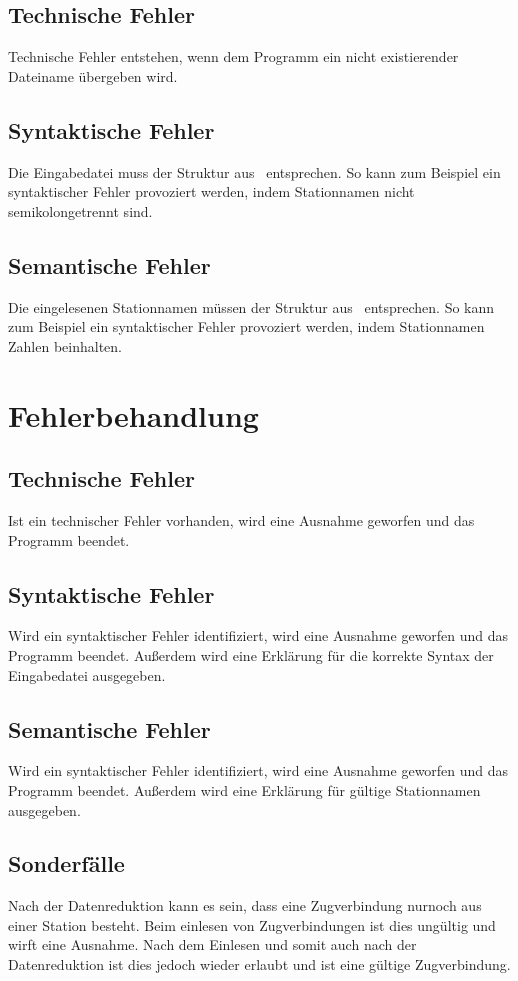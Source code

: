 \subsection{Technische Fehler}\label{subsec:technische-fehler}
Technische Fehler entstehen, wenn dem Programm ein nicht existierender Dateiname übergeben wird.

\subsection{Syntaktische Fehler}\label{subsec:syntaktische-fehler}
Die Eingabedatei muss der Struktur aus~ entsprechen.
So kann zum Beispiel ein syntaktischer Fehler provoziert werden, indem Stationnamen nicht semikolongetrennt sind.

\subsection{Semantische Fehler}\label{subsec:semantische-fehler}
Die eingelesenen Stationnamen müssen der Struktur aus~ entsprechen.
So kann zum Beispiel ein syntaktischer Fehler provoziert werden, indem Stationnamen Zahlen beinhalten.

\section{Fehlerbehandlung}\label{sec:fehlerbehandlung}

\subsection{Technische Fehler}\label{subsec:technische-fehler-behandlung}
Ist ein technischer Fehler vorhanden, wird eine Ausnahme geworfen und das Programm beendet.


\subsection{Syntaktische Fehler}\label{subsec:syntaktische-fehler-behandlung}
Wird ein syntaktischer Fehler identifiziert, wird eine Ausnahme geworfen und das Programm beendet. Außerdem wird eine Erklärung für die korrekte Syntax der Eingabedatei ausgegeben.

\subsection{Semantische Fehler}\label{subsec:semantische-fehler-behandlung}
Wird ein syntaktischer Fehler identifiziert, wird eine Ausnahme geworfen und das Programm beendet. Außerdem wird eine Erklärung für gültige Stationnamen ausgegeben.


\subsection{Sonderfälle}\label{subsec:sonderfaelle}
Nach der Datenreduktion kann es sein, dass eine Zugverbindung nurnoch aus einer Station besteht. Beim einlesen von Zugverbindungen ist dies ungültig und wirft eine Ausnahme. Nach dem Einlesen und somit auch nach der Datenreduktion ist dies jedoch wieder erlaubt und ist eine gültige Zugverbindung.\\
